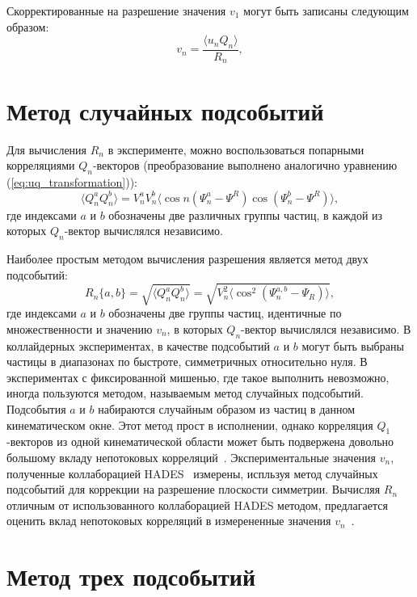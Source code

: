 Скорректированные на разрешение значения $v_1$ могут быть записаны следующим образом: 
%
\begin{equation}
    v_n =  \frac{ \langle u_n Q_n \rangle }{R_n},
    \label{eq:v1_formula}
\end{equation}
%

\section{Метод случайных подсобытий}

Для вычисления $R_n$ в эксперименте, можно воспользоваться попарными корреляциями $Q_n$-векторов (преобразование выполнено аналогично уравнению (\ref{eq:uq_transformation})): 
%
\begin{equation}
    \langle Q_n^a Q_n^b \rangle = V^a_n V^b_n \langle \cos n (\Psi^a_n - \Psi^R) \cos(\Psi^b_n - \Psi^R) \rangle,
\end{equation}
%
где индексами $a$ и $b$ обозначены две различных группы частиц, в каждой из которых $Q_n$-вектор вычислялся независимо.

Наиболее простым методом вычисления разрешения является метод двух подсобытий:
%
\begin{equation}
    R_n\{a,b\} = \sqrt{ \langle Q_n^a Q_n^b \rangle } = \sqrt{ V_n^2 \langle \cos^{2}( \Psi^{a,b}_n - \Psi_R ) \rangle },
\end{equation}
где индексами $a$ и $b$ обозначены две группы частиц, идентичные по множественности и значению $v_n$, в которых $Q_n$-вектор вычислялся независимо.
В коллайдерных экспериментах, в качестве подсобытий $a$ и $b$ могут быть выбраны частицы в диапазонах по быстроте, симметричных относительно нуля.
В экспериментах с фиксированной мишенью, где такое выполнить невозможно, иногда пользуются методом, называемым метод случайных подсобытий.
Подсобытия $a$ и $b$ набираются случайным образом из частиц в данном кинематическом окне.
Этот метод прост в исполнении, однако корреляция $Q_1$-векторов из одной кинематической области может быть подвержена довольно большому вкладу непотоковых корреляций~\cite{Mamaev:2020lpi}.
Экспериментальные значения $v_n$, полученные коллаборацией HADES~\cite{HADES:2020lob} измерены, испльзуя метод случайных подсобытий для коррекции на разрешение плоскости симметрии. 
Вычисляя $R_n$ отличным от использованного коллаборацией HADES методом, предлагается оценить вклад непотоковых корреляций в измерененные значения $v_n$~\cite{Mamaev:2020lpi, Mamaev:2020qom}.

\section{Метод трех подсобытий}


